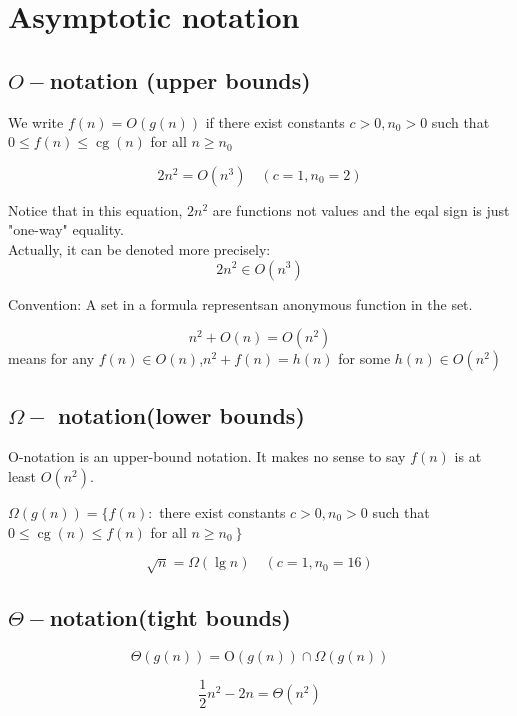\documentclass[11pt,toc=twocol]{elegantbook}
\begin{document}
\section{Asymptotic notation}
\subsection{$O-$notation (upper bounds)}
\begin{definition}
  We write $f(n)=O(g(n))$ if there exist constants $c>0, n_{0}>0$ such that $0 \leq f(n) \leq \operatorname{cg}(n)$ for all $n \geq n_{0}$
\end{definition}
\begin{example}
  $$
  2 n^{2}=O\left(n^{3}\right) \quad\left(c=1, n_{0}=2\right)
  $$
\end{example}
\begin{note}
  Notice that in this equation, $2n^2$ are functions not values and the eqal sign is just "one-way" equality.
  \\Actually, it can be denoted more precisely: 
  $$
  2 n^{2} \in O\left(n^{3}\right)
  $$
\end{note}
\begin{note}
  Convention: A set in a formula representsan anonymous function in the set.
\end{note}
\begin{example}
  $$
  n^{2}+O(n)=O\left(n^{2}\right)
  $$
  means for any $f(n) \in O(n)$,$n^2 + f(n) = h(n)$ for some $h(n) \in O(n^2)$
\end{example}
\subsection{$\Omega-$ notation(lower bounds)}
O-notation is an upper-bound notation. It makes no sense to say $f(n)$ is at least $O(n^2)$.

\begin{definition}
  $\Omega(g(n))=\{f(n):$ there exist constants $c>0, n_{0}>0$ such that $0 \leq \operatorname{cg}(n) \leq f(n)$ for all $\left.n \geq n_{0}\right\}$
\end{definition}

\begin{example}
  $$
  \sqrt{n}=\Omega(\lg n) \quad\left(c=1, n_{0}=16\right)
  $$
\end{example}
\subsection{$\Theta-$notation(tight bounds)}
\begin{definition}
  $$
\Theta(g(n))=\mathrm{O}(g(n)) \cap \Omega(g(n))
$$
\end{definition}
\begin{example}
  $$
  \frac{1}{2} n^{2}-2 n=\Theta\left(n^{2}\right)
  $$
\end{example}
\end{document}
